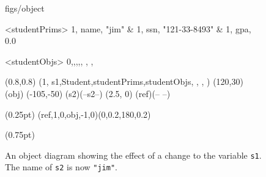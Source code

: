 





\begin {figure}


\Draw

 {figs/object}

\Indirect \Table <studentPrims>
{  
   1, name, "jim" 		&
   1, ssn,  "121-33-8493"		&
   1, gpa,  0.0			
}


\Indirect \Table <studentObjs>
 {  0,,,,, , , }
  


\Scale (0.8,0.8)
\Obj (1, s1,Student,studentPrims,studentObjs, , , )
\Move(120,30)
\FcNode(obj)
\Move(-105,-50)
\Node(s2)(--s2--)
\MoveToExit(2.5, 0)
\ORectNode(ref)(-- --)

\PenSize(0.25pt)
\CurvedEdgeAt(ref,1,0,obj,-1,0)(0,0.2,180,0.2)


\PenSize(0.75pt)


\EndDraw

\caption {An object diagram showing the effect of a change to
the variable \texttt{s1}. The name of \texttt{s2} is now
\texttt{"jim"}.}

\label {fig:assignRef3}

\end {figure}


